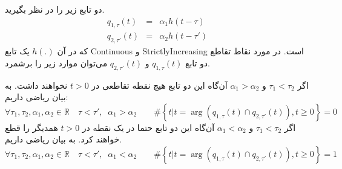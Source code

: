 \begin{lemma}
\label{lem:t1t2increase}
دو تابع  زیر را در نظر بگیرید.
\begin{eqnarray}
q_{1,\tau}(t) &=& \alpha_{1}h(t-\tau) \nonumber\\
q_{2,\tau'}(t) &=& \alpha_{2}h(t-\tau')
\end{eqnarray}
که در آن  $h(.)$ یک تابع 
\gls{Continuous} و \gls{StrictlyIncreasing}
است. در مورد نقاط تقاطع دو تابع 
$q_{1,\tau}(t)$ و $q_{2,\tau'}(t)$ 
می‌توان موارد زیر را برشمرد. 
\begin{itemize}
\hand
اگر 
$\tau_{1} < \tau_{2}$ و $\alpha_{1}> \alpha_{2}$
آن‌گاه این دو تابع  هیچ نقطه تقاطعی در $t>0$ نخواهند داشت. به بیان ریاضی  داریم:
\begin{equation}
\forall \tau_{1}, \tau_{2}, \alpha_{1}, \alpha_{2} \in \mathbb{R}\quad  \tau < \tau',\;  \; \alpha_{1}> \alpha_{2} \quad \quad \#\left\{ t|t = \arg \left(q_{1,\tau}(t) \cap q_{2,\tau'}(t)\right) , t \geq 0\right\} = 0
\end{equation}
\hand
اگر 
$\tau_{1} < \tau_{2}$ و $\alpha_{1}< \alpha_{2}$
آن‌گاه این دو تابع  حتما در یک نقطه در $t>0$ همدیگر را قطع خواهند کرد. به بیان ریاضی داریم.
\begin{equation}
\forall \tau_{1}, \tau_{2}, \alpha_{1}, \alpha_{2} \in \mathbb{R}\quad  \tau < \tau',\;  \; \alpha_{1}< \alpha_{2} \quad \quad \#\left\{ t|t = \arg \left(q_{1,\tau}(t) \cap q_{2,\tau'}(t)\right) , t \geq 0\right\} = 1
\end{equation}
\end{itemize}

\end{lemma}

